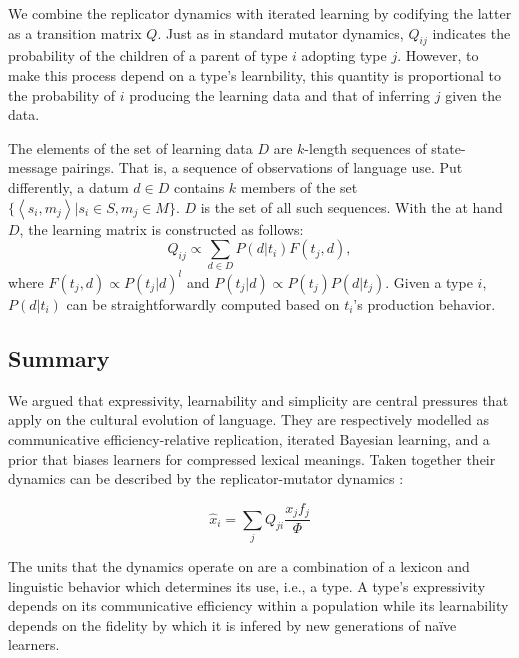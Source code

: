 \documentclass[a4paper]{article}
\newcommand{\tuple}[1]{\ensuremath{\left\langle #1 \right\rangle}}
\begin{document}
We combine the replicator dynamics with iterated learning by codifying the latter as a transition matrix $Q$. Just as in standard mutator dynamics, $Q_{ij}$ indicates the probability of the children of a parent of type $i$ adopting type $j$. However, to make this process depend on a type's learnbility, this quantity is proportional to the probability of $i$ producing the learning data and that of inferring $j$ given the data. 

The elements of the set of learning data $D$ are $k$-length sequences of state-message pairings. That is, a sequence of observations of language use. Put differently, a datum $d \in D$ contains $k$ members of the set $\{\tuple{s_i,m_j} | s_i \in S, m_j \in M\}$. $D$ is the set of all such sequences. With the at hand $D$, the learning matrix is constructed as follows:
\[
 Q_{ij} \propto \sum_{d \in D} P(d|t_i) F(t_j,d),
\]
where $F(t_j,d) \propto P(t_j|d)^l$ and $P(t_j|d) \propto P(t_j) P(d|t_j)$. Given a type $i$, $P(d|t_i)$ can be straightforwardly computed based on $t_i$'s production behavior. 
 

\subsection{Summary}
We argued that expressivity, learnability and simplicity are central pressures that apply on the cultural evolution of language. They are respectively modelled as communicative efficiency-relative replication, iterated Bayesian learning, and a prior that biases learners for compressed lexical meanings. Taken together their dynamics can be described by the replicator-mutator dynamics \citep{hofbauer+sigmund:2003}: 

\[ 
\hat{x}_i = \sum_j Q_{ji} \frac{x_jf_j}{\Phi}
\]

The units that the dynamics operate on are a combination of a lexicon and linguistic behavior which determines its use, i.e., a type. A type's expressivity depends on its communicative efficiency within a population while its learnability depends on the fidelity by which it is infered by new generations of na\"ive learners. 

\end{document}
